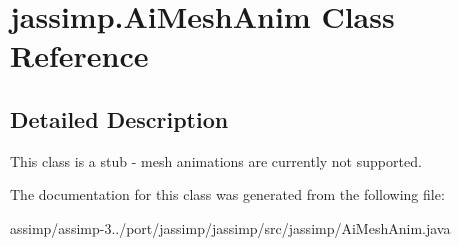\hypertarget{classjassimp_1_1_ai_mesh_anim}{\section{jassimp.\+Ai\+Mesh\+Anim Class Reference}
\label{classjassimp_1_1_ai_mesh_anim}
}


\subsection{Detailed Description}
This class is a stub -\/ mesh animations are currently not supported. 

The documentation for this class was generated from the following file\+:\begin{DoxyCompactItemize}
\item 
assimp/assimp-\/3../port/jassimp/jassimp/src/jassimp/Ai\+Mesh\+Anim.\+java\end{DoxyCompactItemize}
